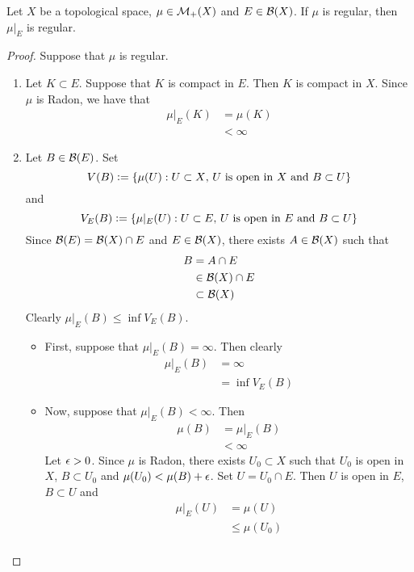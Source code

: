 \documentclass{book}
\begin{document}
	
	
	\begin{ex} 
		Let $X$ be a topological space, $\mu \in \mathcal{M}_+(X)$ and $E \in \mathcal{B}(X)$. If $\mu$ is regular, then $\mu|_E$ is regular.
	\end{ex}

	\begin{proof}
		Suppose that $\mu$ is regular.
		\begin{enumerate}
			\item Let $K \subset E$. Suppose that $K$ is compact in $E$. Then $K$ is compact in $X$. Since $\mu$ is Radon, we have that 
			\begin{align*}
				\mu|_E(K)
				& = \mu(K) \\
				& < \infty
			\end{align*}
			\item Let $B \in \mathcal{B}(E)$. Set 
			$$V(B) \vcentcolon= \{\mu(U): U \subset X \text{, $U$ is open in $X$ and $B \subset U$}\}$$ 
			and 
			$$V_E(B) \vcentcolon= \{\mu|_E(U): U \subset E \text{, $U$ is open in $E$ and $B \subset U$}\}$$
			Since $\mathcal{B}(E) = \mathcal{B}(X) \cap E$ and $E \in \mathcal{B}(X)$, there exists $A \in \mathcal{B}(X)$ such that 
			\begin{align*}
				B 
				& = A \cap E \\
				& \in \mathcal{B}(X) \cap E \\
				& \subset \mathcal{B}(X)
			\end{align*}
			Clearly $\mu|_E(B) \leq \inf V_E(B)$.
			\begin{itemize}
				\item First, suppose that $\mu|_E(B) = \infty$. Then clearly 
				\begin{align*}
					\mu|_E(B)
					& = \infty \\
					& = \inf V_E(B)
				\end{align*}
				\item Now, suppose that $\mu|_E(B) < \infty$. Then 
				\begin{align*}
					\mu(B)
					& = \mu|_E(B) \\
					& < \infty
				\end{align*}
				Let $\epsilon > 0$. Since $\mu$ is Radon, there exists $U_0 \subset X$ such that $U_0$ is open in $X$, $B \subset U_0$ and $\mu(U_0) < \mu(B) + \epsilon$. Set $U = U_0 \cap E$. Then $U$ is open in $E$, $B \subset U$ and 
				\begin{align*}
					\mu|_E(U)
					& = \mu(U) \\
					& \leq \mu(U_0) \\

\end{align*}
\end{itemize}
\end{enumerate}
\end{proof}
\end{document}
